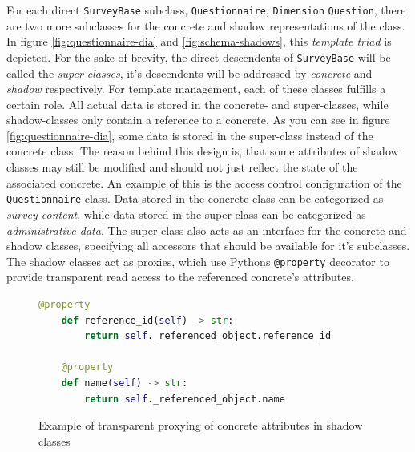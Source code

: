 \documentclass[a4paper,11pt]{article}
\def\inline{\lstinline[basicstyle=\ttfamily,keywordstyle={}]}
\begin{document}
                For each direct \inline{SurveyBase} subclass, \inline{Questionnaire}, \inline{Dimension}
                \inline{Question}, there are two more subclasses for the concrete and shadow
                representations of the class. In figure \ref{fig:questionnaire-dia} and \ref{fig:schema-shadows},
                this \textit{template triad} is depicted. For the sake of brevity,
                the direct descendents of \inline{SurveyBase} will be called the \textit{super-classes},
                it's descendents will be addressed by \textit{concrete} and \textit{shadow}
                respectively. For template management,
                each of these classes fulfills a certain role. All actual data is stored
                in the concrete- and super-classes, while shadow-classes only
                contain a reference to a concrete. As you can see in figure \ref{fig:questionnaire-dia},
                some data is stored in the super-class instead of the concrete class.
                The reason behind this design is, that some attributes of shadow classes
                may still be modified and should not just reflect the state of the associated
                concrete. An example of this is the access control configuration
                of the \inline{Questionnaire} class. Data stored in the concrete
                class can be categorized as \textit{survey content}, while data
                stored in the super-class can be categorized as \textit{administrative data}.
                The super-class also acts as an interface for the concrete and shadow classes,
                specifying all accessors that should be available for it's subclasses.
                The shadow classes act as proxies, which use Pythons \inline{@property}
                decorator to provide transparent read access to the referenced concrete's
                attributes.

                \begin{figure}[H]
                    \begin{lstlisting}[language=Python,frame=lines,backgroundcolor=\color{background},firstnumber=285]
    @property
    def reference_id(self) -> str:
        return self._referenced_object.reference_id

    @property
    def name(self) -> str:
        return self._referenced_object.name
                    \end{lstlisting}
                    \caption{Example of transparent proxying of concrete attributes in shadow classes}
                \end{figure}
        
\end{document}
